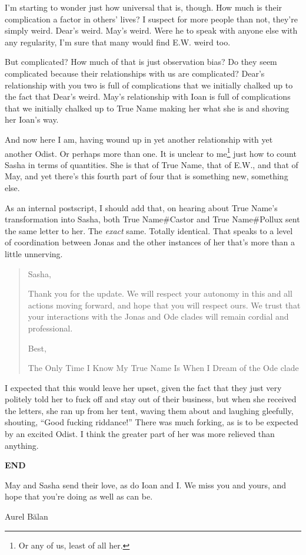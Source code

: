 I'm starting to wonder just how universal that is, though. How much is their complication a factor in others' lives? I suspect for more people than not, they're simply weird. Dear's weird. May's weird. Were he to speak with anyone else with any regularity, I'm sure that many would find E.W. weird too.

But complicated? How much of that is just observation bias? Do they seem complicated because their relationships with us are complicated? Dear's relationship with you two is full of complications that we initially chalked up to the fact that Dear's weird. May's relationship with Ioan is full of complications that we initially chalked up to True Name making her what she is and shoving her Ioan's way.

And now here I am, having wound up in yet another relationship with yet another Odist. Or perhaps more than one. It is unclear to me\footnote{Or any of us, least of all her.} just how to count Sasha in terms of quantities. She is that of True Name, that of E.W., and that of May, and yet there's this fourth part of four that is something new, something else.

As an internal postscript, I should add that, on hearing about True Name's transformation into Sasha, both True Name\#Castor and True Name\#Pollux sent the same letter to her. The \emph{exact} same. Totally identical. That speaks to a level of coordination between Jonas and the other instances of her that's more than a little unnerving.

\begin{quote}
Sasha,

Thank you for the update. We will respect your autonomy in this and all actions moving forward, and hope that you will respect ours. We trust that your interactions with the Jonas and Ode clades will remain cordial and professional.

Best,

The Only Time I Know My True Name Is When I Dream of the Ode clade
\end{quote}

I expected that this would leave her upset, given the fact that they just very politely told her to fuck off and stay out of their business, but when she received the letters, she ran up from her tent, waving them about and laughing gleefully, shouting, ``Good fucking riddance!'' There was much forking, as is to be expected by an excited Odist. I think the greater part of her was more relieved than anything.

\textbf{END}

May and Sasha send their love, as do Ioan and I. We miss you and yours, and hope that you're doing as well as can be.

Aurel Bălan
